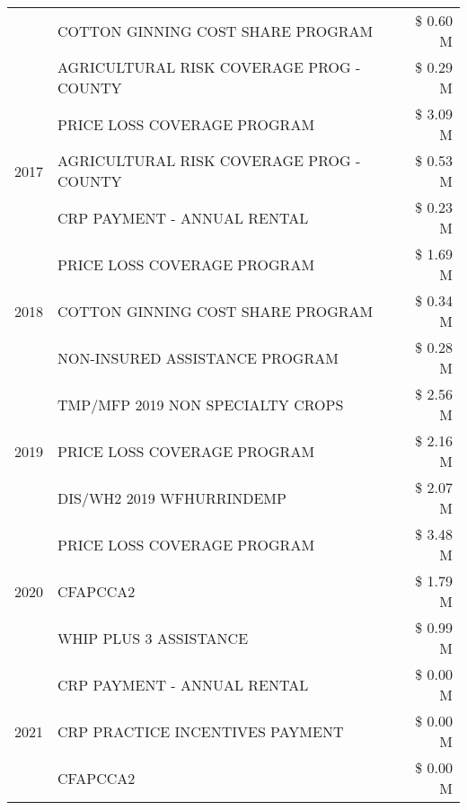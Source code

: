 \begin{tabular}{llr}
 & COTTON GINNING COST SHARE PROGRAM             & \$ 0.60 M \\
 & AGRICULTURAL RISK COVERAGE PROG - COUNTY      & \$ 0.29 M \\
\cline{1-3}
\multirow[t]{3}{*}{2017} & PRICE LOSS COVERAGE PROGRAM & \$ 3.09 M \\
 & AGRICULTURAL RISK COVERAGE PROG - COUNTY & \$ 0.53 M \\
 & CRP PAYMENT - ANNUAL RENTAL & \$ 0.23 M \\
\cline{1-3}
\multirow[t]{3}{*}{2018} & PRICE LOSS COVERAGE PROGRAM & \$ 1.69 M \\
 & COTTON GINNING COST SHARE PROGRAM & \$ 0.34 M \\
 & NON-INSURED ASSISTANCE PROGRAM & \$ 0.28 M \\
\cline{1-3}
\multirow[t]{3}{*}{2019} & TMP/MFP 2019 NON SPECIALTY CROPS & \$ 2.56 M \\
 & PRICE LOSS COVERAGE PROGRAM & \$ 2.16 M \\
 & DIS/WH2 2019 WFHURRINDEMP & \$ 2.07 M \\
\cline{1-3}
\multirow[t]{3}{*}{2020} & PRICE LOSS COVERAGE PROGRAM & \$ 3.48 M \\
 & CFAPCCA2 & \$ 1.79 M \\
 & WHIP PLUS 3 ASSISTANCE & \$ 0.99 M \\
\cline{1-3}
\multirow[t]{3}{*}{2021} & CRP PAYMENT - ANNUAL RENTAL & \$ 0.00 M \\
 & CRP PRACTICE INCENTIVES PAYMENT & \$ 0.00 M \\
 & CFAPCCA2 & \$ 0.00 M \\
\cline{1-3}
\bottomrule
\end{tabular}
